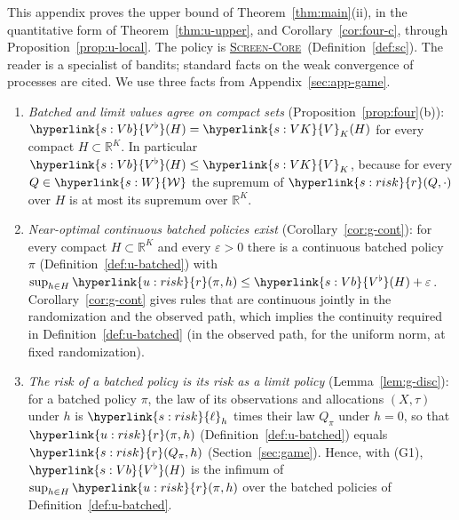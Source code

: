 \documentclass[11pt]{article}
\DeclareRobustCommand{\sy}[2]{{\hyperlink{#1}{#2}}}
\newcommand{\R}{\mathbb{R}}
\newcommand{\1}{\mathbf{1}}
\newcommand{\Wc}{\sy{s:W}{\mathcal W}}
\newcommand{\rk}{\sy{s:risk}{r}}
\newcommand{\lh}{\sy{s:risk}{\ell}}
\newcommand{\VK}{\sy{s:VK}{V}}
\newcommand{\Vb}{\sy{s:Vb}{V^\flat}}
\newcommand{\SC}{\sy{alg:sc}{\textsc{Screen-Core}}}
\begin{document}
\newcommand{\uSimp}{\sy{u:batched}{\mathcal S_K}}
\newcommand{\urk}{\sy{u:risk}{r}}
\newcommand{\uDisc}[3]{\sy{u:disc}{#1_{#2}[#3]}}
\newcommand{\uRG}{\sy{u:RG}{R^{\mathrm G}}}
\newcommand{\umus}{\sy{u:setting}{\mu^\star}}
\newcommand{\uN}{\sy{alg:sc}{N}}
\newcommand{\urho}{\sy{alg:sc}{\rho}}
\newcommand{\uS}{\sy{alg:sc}{S}}
\newcommand{\uio}{\sy{alg:sc}{i_0}}
\newcommand{\umuh}{\sy{alg:sc}{\hat\mu}}
\newcommand{\umuref}{\sy{alg:sc}{\hat\mu_{\mathrm{ref}}}}
\newcommand{\usigh}{\sy{alg:sc}{\hat\sigma}}
\newcommand{\uw}{\sy{alg:sc}{w}}
\newcommand{\uc}{\sy{alg:sc}{c}}
\newcommand{\upulls}{\sy{u:virtual}{n}}
\newcommand{\uTp}{\sy{u:virtual}{T'}}
\newcommand{\unu}{\sy{u:virtual}{\tilde\nu}}
\newcommand{\umusS}{\sy{u:virtual}{\mu^\star_{S}}}
\newcommand{\uD}{\sy{u:dev}{D}}
\newcommand{\uCD}{\sy{u:CD}{C_D}}
\newcommand{\upv}{\sy{u:pvar}{p_{\mathrm{var}}}}
\newcommand{\uF}{\sy{u:decomp}{\mathcal F^{\mathrm{scr}}}}
\newcommand{\uRt}{\sy{u:decomp}{\tilde R}}
\newcommand{\uM}{\sy{u:param}{M}}
\newcommand{\uCt}{\sy{u:param}{C_3}}
\newcommand{\uG}{\sy{u:good}{\mathcal G}}


\medskip
This appendix proves the upper bound of Theorem~\ref{thm:main}(ii), in the quantitative form of Theorem~\ref{thm:u-upper}, and
Corollary~\ref{cor:four-c}, through Proposition~\ref{prop:u-local}. The policy is \SC\ (Definition~\ref{def:sc}). The reader is a specialist of bandits;
standard facts on the weak convergence of processes are cited. We use three facts from Appendix~\ref{sec:app-game}.
\begin{enumerate}
\item[(G1)] \emph{Batched and limit values agree on compact sets} (Proposition~\ref{prop:four}(b)): $\Vb(H)=\VK_K(H)$ for every compact $H\subset\R^K$. In particular
$\Vb(H)\le\VK_K$, because for every $Q\in\Wc$ the supremum of $\rk(Q,\cdot)$ over $H$ is at most its supremum over $\R^K$.
\item[(G2)] \emph{Near-optimal continuous batched policies exist} (Corollary~\ref{cor:g-cont}): for every compact $H\subset\R^K$ and every $\varepsilon>0$ there is a
continuous batched policy $\pi$ (Definition~\ref{def:u-batched}) with $\sup_{h\in H}\urk(\pi,h)\le\Vb(H)+\varepsilon$. Corollary~\ref{cor:g-cont} gives rules that
are continuous jointly in the randomization and the observed path, which implies the continuity required in Definition~\ref{def:u-batched} (in the observed path,
for the uniform norm, at fixed randomization).
\item[(G3)] \emph{The risk of a batched policy is its risk as a limit policy} (Lemma~\ref{lem:g-disc}): for a batched policy $\pi$, the law of its observations and allocations
$(X,\tau)$ under $h$ is $\lh_h$ times their law $Q_\pi$ under $h=0$, so that $\urk(\pi,h)$ (Definition~\ref{def:u-batched}) equals $\rk(Q_\pi,h)$
(Section~\ref{sec:game}). Hence, with (G1), $\Vb(H)$ is the infimum of $\sup_{h\in H}\urk(\pi,h)$ over the batched policies of Definition~\ref{def:u-batched}.
\end{enumerate}
\end{document}
